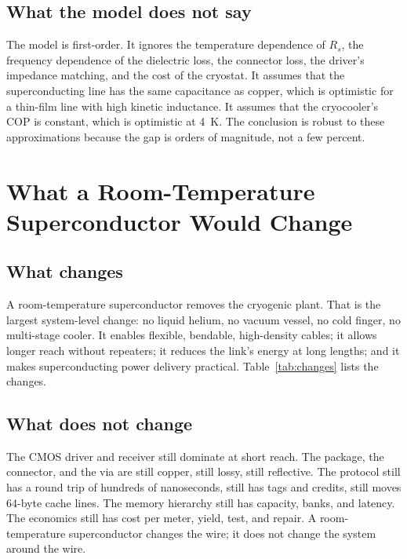 \documentclass[10pt,letterpaper]{article}
\begin{document}
\subsection{What the model does not say}

The model is first-order. It ignores the temperature dependence of $R_s$, the frequency dependence of the dielectric loss, the connector loss, the driver's impedance matching, and the cost of the cryostat. It assumes that the superconducting line has the same capacitance as copper, which is optimistic for a thin-film line with high kinetic inductance. It assumes that the cryocooler's COP is constant, which is optimistic at 4~K. The conclusion is robust to these approximations because the gap is orders of magnitude, not a few percent.

\section{What a Room-Temperature Superconductor Would Change}
\label{sec:changes}

\subsection{What changes}

A room-temperature superconductor removes the cryogenic plant. That is the largest system-level change: no liquid helium, no vacuum vessel, no cold finger, no multi-stage cooler. It enables flexible, bendable, high-density cables; it allows longer reach without repeaters; it reduces the link's energy at long lengths; and it makes superconducting power delivery practical. Table~\ref{tab:changes} lists the changes.

\subsection{What does not change}

The CMOS driver and receiver still dominate at short reach. The package, the connector, and the via are still copper, still lossy, still reflective. The protocol still has a round trip of hundreds of nanoseconds, still has tags and credits, still moves 64-byte cache lines. The memory hierarchy still has capacity, banks, and latency. The economics still has cost per meter, yield, test, and repair. A room-temperature superconductor changes the wire; it does not change the system around the wire.
\end{document}
